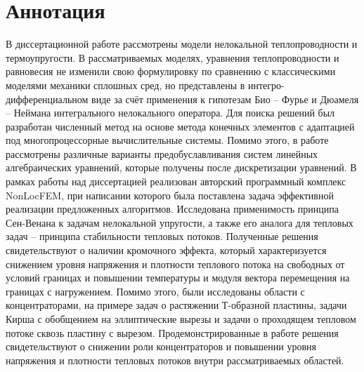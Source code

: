 \chapter*{Аннотация}

В диссертационной работе рассмотрены модели нелокальной теплопроводности и термоупругости. В рассматриваемых моделях, уравнения теплопроводности и равновесия не изменили свою формулировку по сравнению с классическими моделями механики сплошных сред, но представлены в интегро-дифференциальном виде за счёт применения к гипотезам Био – Фурье и Дюамеля – Неймана интегрального нелокального оператора. Для поиска решений был разработан численный метод на основе метода конечных элементов с адаптацией под многопроцессорные вычислительные системы. Помимо этого, в работе рассмотрены различные варианты предобуславливания систем линейных алгебраических уравнений, которые получены после дискретизации уравнений. В рамках работы над диссертацией реализован авторский программный комплекс NonLocFEM, при написании которого была поставлена задача эффективной реализации предложенных алгоритмов. Исследована применимость принципа Сен-Венана к задачам нелокальной упругости, а также его аналога для тепловых задач – принципа стабильности тепловых потоков. Полученные решения свидетельствуют о наличии кромочного эффекта, который характеризуется снижением уровня напряжения и плотности теплового потока на свободных от условий границах и повышении температуры и модуля вектора перемещения на границах с нагружением. Помимо этого, были исследованы области с концентраторами, на примере задач о растяжении Т-образной пластины, задачи Кирша с обобщением на эллиптические вырезы и задачи о проходящем тепловом потоке сквозь пластину с вырезом. Продемонстрированные в работе решения свидетельствуют о снижении роли концентраторов и повышении уровня напряжения и плотности тепловых потоков внутри рассматриваемых областей.